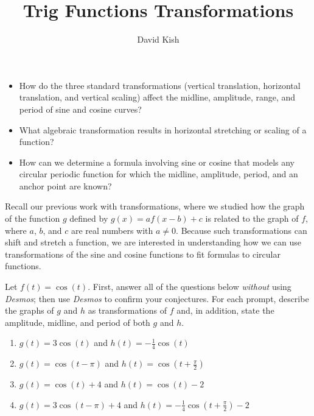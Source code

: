 \documentclass{ximera}
\author{David Kish}
\title{Trig Functions Transformations}
\begin{document}
\begin{abstract}
  
\end{abstract}
\maketitle

%
%
%


%
\begin{motivatingQuestions}
\begin{itemize}[label=\textbullet]
\item{}
How do the three standard transformations (vertical translation, horizontal translation, and vertical scaling) affect the midline, amplitude, range, and period of sine and cosine curves?%
\item{}
What algebraic transformation results in horizontal stretching or scaling of a function?%
\item{}
How can we determine a formula involving sine or cosine that models any circular periodic function for which the midline, amplitude, period, and an anchor point are known?%
\end{itemize}
\end{motivatingQuestions}

Recall our previous work with transformations, where we studied how the graph of the function \(g\) defined by \(g(x) = af(x-b) + c\) is related to the graph of \(f\), where \(a\), \(b\), and \(c\) are real numbers with \(a \ne 0\).  Because such transformations can shift and stretch a function, we are interested in understanding how we can use transformations of the sine and cosine functions to fit formulas to circular functions.%
\begin{exploration}
Let \(f(t) = \cos(t)\).  First, answer all of the questions below \emph{without} using \emph{Desmos}; then use \emph{Desmos} to confirm your conjectures.  For each prompt, describe the graphs of \(g\) and \(h\) as transformations of \(f\) and, in addition, state the amplitude, midline, and period of both \(g\) and \(h\).%
\begin{enumerate}[label=\alph*.]
\item \(g(t) = 3\cos(t)\) and \(h(t) = -\frac{1}{4}\cos(t)\)%
\item \(g(t) = \cos(t-\pi)\) and \(h(t) = \cos\left(t+ \frac{\pi}{2}\right)\)%
\item \(g(t) = \cos(t)+4\) and \(h(t) = \cos\left(t\right)-2\)%
\item \(g(t) = 3\cos(t-\pi)+4\) and \(h(t) = -\frac{1}{4}\cos\left(t+ \frac{\pi}{2}\right)-2\)%
\end{enumerate}
%
\end{exploration}
\end{document}
